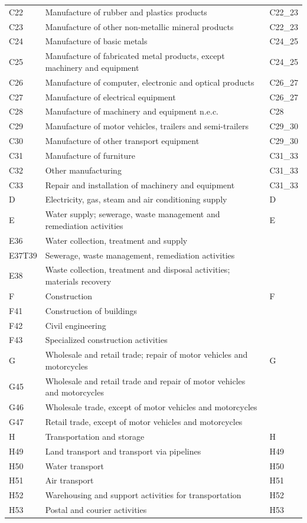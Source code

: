 \documentclass[12pt]{article}
\begin{document}
\begin{tabularx}{\textwidth}{l X l}
C22     & Manufacture of rubber and plastics products & C22\_23 \\
C23     & Manufacture of other non-metallic mineral products & C22\_23 \\
C24     & Manufacture of basic metals & C24\_25 \\
C25     & Manufacture of fabricated metal products, except machinery and equipment & C24\_25 \\
C26     & Manufacture of computer, electronic and optical products & C26\_27 \\
C27     & Manufacture of electrical equipment & C26\_27 \\
C28     & Manufacture of machinery and equipment n.e.c. & C28 \\
C29     & Manufacture of motor vehicles, trailers and semi-trailers & C29\_30 \\
C30     & Manufacture of other transport equipment & C29\_30 \\
C31     & Manufacture of furniture & C31\_33 \\
C32     & Other manufacturing & C31\_33 \\
C33     & Repair and installation of machinery and equipment & C31\_33 \\
D       & Electricity, gas, steam and air conditioning supply & D \\
E       & Water supply; sewerage, waste management and remediation activities & E \\
E36     & Water collection, treatment and supply &  \\
E37T39  & Sewerage, waste management, remediation activities &  \\
E38     & Waste collection, treatment and disposal activities; materials recovery &  \\
F       & Construction & F \\
F41     & Construction of buildings &  \\
F42     & Civil engineering &  \\
F43     & Specialized construction activities &  \\
G       & Wholesale and retail trade; repair of motor vehicles and motorcycles & G \\
G45     & Wholesale and retail trade and repair of motor vehicles and motorcycles &  \\
G46     & Wholesale trade, except of motor vehicles and motorcycles &  \\
G47     & Retail trade, except of motor vehicles and motorcycles &  \\
H       & Transportation and storage & H \\
H49     & Land transport and transport via pipelines & H49 \\
H50     & Water transport & H50 \\
H51     & Air transport & H51 \\
H52     & Warehousing and support activities for transportation & H52 \\
H53     & Postal and courier activities & H53 \\
\hline
\end{tabularx}
\end{document}
